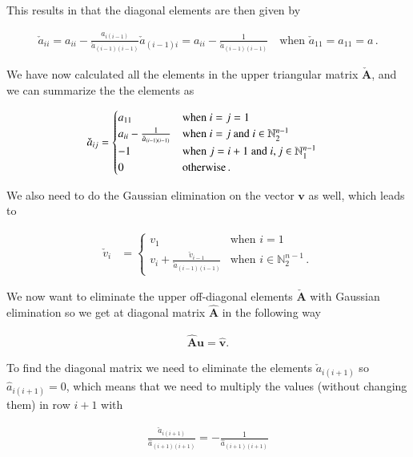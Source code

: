 \documentclass[11pt,english,a4paper]{article}
\begin{document}
\begin{flushleft}
This results in that the diagonal elements are then given by

\begin{align}
\check{a}_{ii} = a_{ii} - \frac{a_{i(i-1)}}{\check{a}_{(i-1)(i-1)}} \check{a}_{(i-1)i} = a_{ii} - \frac{1}{\check{a}_{(i-1)(i-1)}} \quad \text{when }\check{a}_{11} = a_{11} = a\,.
\label{eq_19}
\end{align} 

We have now calculated all the elements in the upper triangular matrix $\check{\textbf{A}}$, and we can summarize the the elements as

\begin{align*}
\check{a}_{ij} &= \begin{cases} a_{11} & \text{when $i=j=1$} \\ a_{ii} - \frac{1}{\check{a}_{(i-1)(i-1)}} & \text{when $i=j$ and  $i\in\mathbb{N}_2^{n-1}$} \\ -1 & \text{when $j=i+1$ and $i,j\in\mathbb{N}_1^{n-1}$} \\ 0 & \text{otherwise\,.}\end{cases}
\end{align*}

We also need to do the Gaussian elimination on the vector $\textbf{v}$ as well, which leads to

\begin{align}
\check{v}_i &= \begin{cases} v_1 & \text{when $i=1$} \\ v_i + \frac{\check{v}_{i-1}}{\check{a}_{(i-1)(i-1)}} & \text{when $i\in\mathbb{N}_2^{n-1}$}\,. \end{cases}
\label{eq_20}
\end{align}

We now want to eliminate the upper off-diagonal elements $\check{\textbf{A}}$ with Gaussian elimination so we get at diagonal matrix $\hat{\textbf{A}}$ in the following way

\begin{align*}
\hat{\textbf{A}}\textbf{u} = \hat{\textbf{v}}.
\end{align*}

To find the diagonal matrix we need to eliminate the elements $\check{a}_{i(i+1)}$ so $\hat{a}_{i(i+1)}=0$, which means that we need to multiply the values (without changing them) in row $i+1$ with

\begin{align*}
\frac{\check{a}_{i(i+1)}}{\hat{a}_{(i+1)(i+1)}} = - \frac{1}{\hat{a}_{(i+1)(i+1)}}
\end{align*} 


\end{flushleft}
\end{document}
